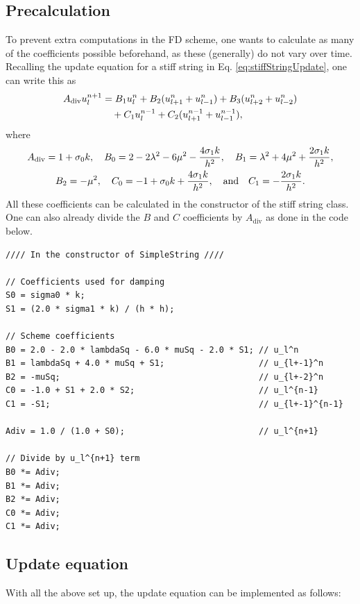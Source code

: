 \subsection{Precalculation}
To prevent extra computations in the FD scheme, one wants to calculate as many of the coefficients possible beforehand, as these (generally) do not vary over time. Recalling the update equation for a stiff string in Eq. \eqref{eq:stiffStringUpdate}, one can write this as
\begin{equation}
    \begin{aligned}
        A_\text{div} u_l^{n+1} &= B_1 u_l^n + B_2 (u_{l+1}^n + u_{l-1}^n) + B_3(u_{l+2}^n + u_{l-2}^n) \\
        &\quad+ C_1u_l^{n-1}+ C_2(u_{l+1}^{n-1} + u_{l-1}^{n-1}),
    \end{aligned}
    \end{equation}
where
\begin{gather*}
    A_\text{div} = 1+\sigma_{0} k, \quad B_0 = 2 - 2\lambda^2 - 6\mu^2 - \frac{4\sigma_{1} k}{h^2}, \quad B_1 = \lambda^2 + 4\mu^2 + \frac{2\sigma_{1} k}{h^2},\\
    B_2 = - \mu^2, \quad C_0 = -1+\sigma_{0} k + \frac{4\sigma_{1} k}{h^2},\quad \text{and} \quad C_1 = - \frac{2\sigma_{1} k}{h^2}.
\end{gather*}
All these coefficients can be calculated in the constructor of the stiff string class. One can also already divide the $B$ and $C$ coefficients by $A_\text{div}$ as done in the code below.
\setlstCpp
\begin{lstlisting}[]
//// In the constructor of SimpleString ////

// Coefficients used for damping
S0 = sigma0 * k;
S1 = (2.0 * sigma1 * k) / (h * h);

// Scheme coefficients
B0 = 2.0 - 2.0 * lambdaSq - 6.0 * muSq - 2.0 * S1; // u_l^n
B1 = lambdaSq + 4.0 * muSq + S1;                   // u_{l+-1}^n
B2 = -muSq;                                        // u_{l+-2}^n
C0 = -1.0 + S1 + 2.0 * S2;                         // u_l^{n-1}
C1 = -S1;                                          // u_{l+-1}^{n-1}

Adiv = 1.0 / (1.0 + S0);                           // u_l^{n+1}

// Divide by u_l^{n+1} term
B0 *= Adiv;
B1 *= Adiv;
B2 *= Adiv;
C0 *= Adiv;
C1 *= Adiv;
\end{lstlisting}

\subsection{Update equation}\label{sec:updateEquationCpp}
With all the above set up, the update equation can be implemented as follows:


